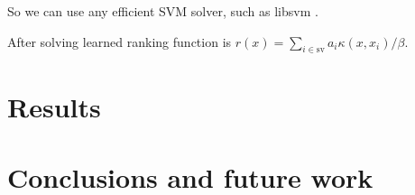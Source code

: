\documentclass{article}
\begin{document}
So we can use any efficient SVM solver, such as libsvm
\citep{libsvm}.

After solving learned ranking function is $r(x) = \sum_{i\in\text{sv}}
a_i \kappa(x, x_i)/\beta$.

\section{Results}
\label{sec:results}

\section{Conclusions and future work}
\label{sec:conclusions}



\end{document}

